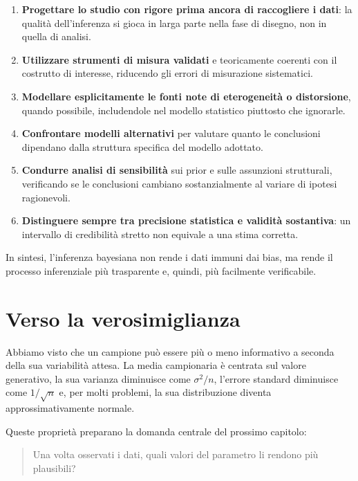 \documentclass[
  italian,
  letterpaper,
  a4paper,
  11pt,
  open=any]{scrbook}
\theoremstyle{plain}
\theoremstyle{definition}
\theoremstyle{definition}
\theoremstyle{remark}
\begin{document}
\begin{enumerate}
\def\labelenumi{\arabic{enumi}.}
\item
  \textbf{Progettare lo studio con rigore prima ancora di raccogliere i
  dati}: la qualità dell'inferenza si gioca in larga parte nella fase di
  disegno, non in quella di analisi.
\item
  \textbf{Utilizzare strumenti di misura validati} e teoricamente
  coerenti con il costrutto di interesse, riducendo gli errori di
  misurazione sistematici.
\item
  \textbf{Modellare esplicitamente le fonti note di eterogeneità o
  distorsione}, quando possibile, includendole nel modello statistico
  piuttosto che ignorarle.
\item
  \textbf{Confrontare modelli alternativi} per valutare quanto le
  conclusioni dipendano dalla struttura specifica del modello adottato.
\item
  \textbf{Condurre analisi di sensibilità} sui prior e sulle assunzioni
  strutturali, verificando se le conclusioni cambiano sostanzialmente al
  variare di ipotesi ragionevoli.
\item
  \textbf{Distinguere sempre tra precisione statistica e validità
  sostantiva}: un intervallo di credibilità stretto non equivale a una
  stima corretta.
\end{enumerate}

In sintesi, l'inferenza bayesiana non rende i dati immuni dai bias, ma
rende il processo inferenziale più trasparente e, quindi, più facilmente
verificabile.

\section{Verso la verosimiglianza}\label{sec-towards-likelihood}

Abbiamo visto che un campione può essere più o meno informativo a
seconda della sua variabilità attesa. La media campionaria è centrata
sul valore generativo, la sua varianza diminuisce come \(\sigma^2/n\),
l'errore standard diminuisce come \(1/\sqrt{n}\) e, per molti problemi,
la sua distribuzione diventa approssimativamente normale.

Queste proprietà preparano la domanda centrale del prossimo capitolo:

\begin{quote}
Una volta osservati i dati, quali valori del parametro li rendono più
plausibili?
\end{quote}
\end{document}
